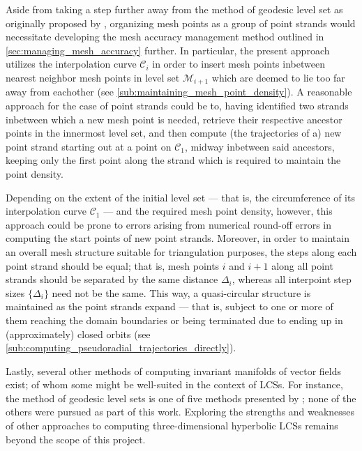 Aside from taking a step further away from the method of geodesic level set as
originally proposed by \textcite{krauskopf2005survey}, organizing mesh
points as a group of point strands would necessitate developing the mesh
accuracy management method outlined in \cref{sec:managing_mesh_accuracy}
further. In particular, the present approach utilizes the interpolation curve
$\mathcal{C}_{i}$ in order to insert mesh points inbetween nearest neighbor
mesh points in level set $\mathcal{M}_{i+1}$ which are deemed to lie too far
away from eachother (see \cref{sub:maintaining_mesh_point_density}). A
reasonable approach for the case of point strands could be to, having
identified two strands inbetween which a new mesh point is needed, retrieve
their respective ancestor points in the innermost level set, and then compute
(the trajectories of a) new point strand starting out at a point on
$\mathcal{C}_{1}$, midway inbetween said ancestors, keeping only the first
point along the strand which is required to maintain the point density.

Depending on the extent of the initial level set --- that is, the circumference
of its interpolation curve $\mathcal{C}_{1}$ --- and the required mesh point
density, however, this approach could be prone to errors arising from numerical
round-off errors in computing the start points of new point strands. Moreover,
in order to maintain an overall mesh structure suitable for triangulation
purposes, the steps along each point strand should be equal; that is, mesh
points $i$ and $i+1$ along all point strands should be separated by the same
distance $\Delta_{i}$, whereas all interpoint step sizes $\{\Delta_{i}\}$ need
not be the same. This way, a quasi-circular structure is maintained as the
point strands expand --- that is, subject to one or more of them reaching the
domain boundaries or being terminated due to ending up in (approximately)
closed orbits (see \cref{sub:computing_pseudoradial_trajectories_directly}).

Lastly, several other methods of computing invariant manifolds of vector fields
exist; of whom some might be well-suited in the context of LCSs. For instance,
the method of geodesic level sets is one of five methods presented by
\textcite{krauskopf2005survey}; none of the others were pursued as part of this
work. Exploring the strengths and weaknesses of other
approaches to computing three-dimensional hyperbolic LCSs remains beyond the
scope of this project.
